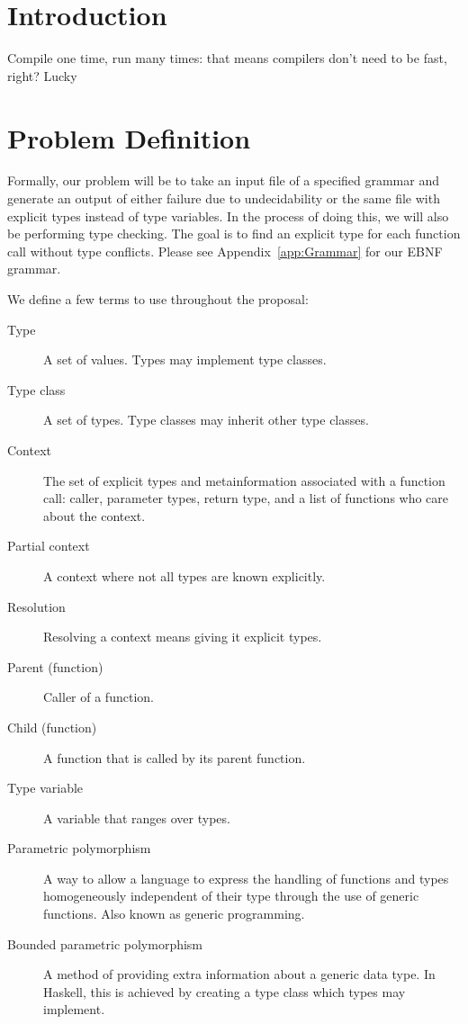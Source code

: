 \documentclass{acm_proc_article-sp}
\begin{document}


\section{Introduction}


Compile one time, run many times: that means compilers don't need to
be fast, right? Lucky

\section{Problem Definition}
\label{sec:problem}

Formally, our problem will be to take an input file of a specified grammar and
generate an output of either failure due to undecidability or the same file
with explicit types instead of type variables. In the process of doing this, we
will also be performing type checking. The goal is to find an explicit type for
each function call without type conflicts. Please see Appendix~\ref{app:Grammar}
for our EBNF grammar.

We define a few terms to use throughout the proposal:
\begin{description}
	\item[Type] A set of values. Types may implement type classes.
	\item[Type class] A set of types. Type classes may inherit other type classes.
	\item[Context] The set of explicit types and metainformation associated
		with a function call: caller, parameter types, return type,
		and a list of functions who care about the context.
	\item[Partial context] A context where not all types are known explicitly.
	\item[Resolution] Resolving a context means giving it explicit types.
	\item[Parent (function)] Caller of a function.
	\item[Child (function)] A function that is called by its parent function.
	\item[Type variable] A variable that ranges over types.
	\item[Parametric polymorphism] A way to allow a language to express the
		handling of functions and types homogeneously independent of their type
		through the use of generic functions. Also known as generic
		programming.
	\item[Bounded parametric polymorphism] A method of providing extra
		information about a generic data type. In Haskell, this is achieved by
		creating a type class which types may implement.
\end{description}
\end{document}
